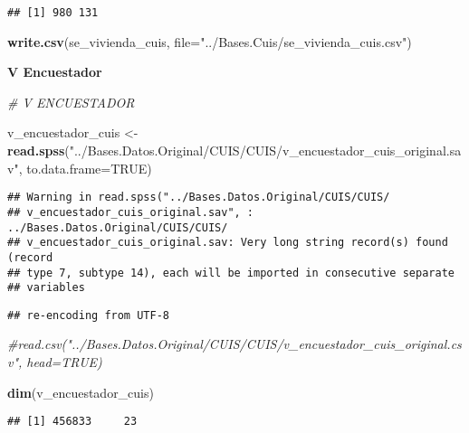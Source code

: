 \documentclass[11pt,]{article}
\newenvironment{Shaded}{\begin{snugshade}}{\end{snugshade}}
\newcommand{\KeywordTok}[1]{\textcolor[rgb]{0.13,0.29,0.53}{\textbf{#1}}}
\newcommand{\DataTypeTok}[1]{\textcolor[rgb]{0.13,0.29,0.53}{#1}}
\newcommand{\DecValTok}[1]{\textcolor[rgb]{0.00,0.00,0.81}{#1}}
\newcommand{\StringTok}[1]{\textcolor[rgb]{0.31,0.60,0.02}{#1}}
\newcommand{\CommentTok}[1]{\textcolor[rgb]{0.56,0.35,0.01}{\textit{#1}}}
\newcommand{\OtherTok}[1]{\textcolor[rgb]{0.56,0.35,0.01}{#1}}
\newcommand{\OperatorTok}[1]{\textcolor[rgb]{0.81,0.36,0.00}{\textbf{#1}}}
\newcommand{\NormalTok}[1]{#1}
\begin{document}
\begin{verbatim}
## [1] 980 131
\end{verbatim}

\begin{Shaded}
\begin{Highlighting}[]
\KeywordTok{write.csv}\NormalTok{(se_vivienda_cuis, }\DataTypeTok{file=}\StringTok{"../Bases.Cuis/se_vivienda_cuis.csv"}\NormalTok{)}
\end{Highlighting}
\end{Shaded}

\textbf{V Encuestador}

\begin{Shaded}
\begin{Highlighting}[]
\CommentTok{# V ENCUESTADOR}

\NormalTok{v_encuestador_cuis <-}\StringTok{ }\KeywordTok{read.spss}\NormalTok{(}\StringTok{"../Bases.Datos.Original/CUIS/CUIS/v_encuestador_cuis_original.sav"}\NormalTok{, }\DataTypeTok{to.data.frame=}\OtherTok{TRUE}\NormalTok{)}
\end{Highlighting}
\end{Shaded}

\begin{verbatim}
## Warning in read.spss("../Bases.Datos.Original/CUIS/CUIS/
## v_encuestador_cuis_original.sav", : ../Bases.Datos.Original/CUIS/CUIS/
## v_encuestador_cuis_original.sav: Very long string record(s) found (record
## type 7, subtype 14), each will be imported in consecutive separate
## variables
\end{verbatim}

\begin{verbatim}
## re-encoding from UTF-8
\end{verbatim}

\begin{Shaded}
\begin{Highlighting}[]
                     \CommentTok{#read.csv("../Bases.Datos.Original/CUIS/CUIS/v_encuestador_cuis_original.csv", head=TRUE)}

\KeywordTok{dim}\NormalTok{(v_encuestador_cuis)}
\end{Highlighting}
\end{Shaded}

\begin{verbatim}
## [1] 456833     23
\end{verbatim}

\begin{Shaded}
\end{Shaded}
\end{document}
